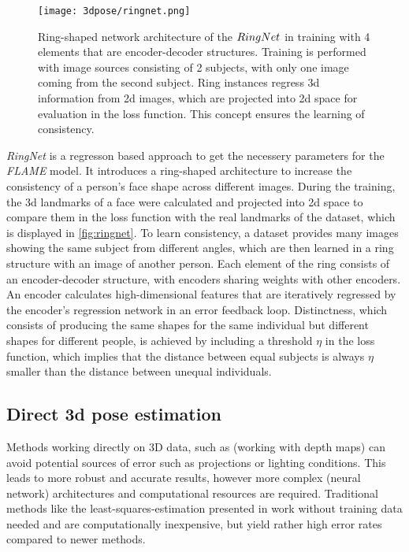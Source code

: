 \begin{figure}[h]
	\centering
	\texttt{[image: 3dpose/ringnet.png]}
	\caption{Ring-shaped network architecture of the $\protect RingNet$ in training with 4 elements that are encoder-decoder structures. Training is performed with image sources consisting of 2 subjects, with only one image coming from the second subject. Ring instances regress 3d information from 2d images, which are projected into 2d space for evaluation in the loss function. This concept ensures the learning of consistency.\cite{ringnet}}
	\label{fig:ringnet}
\end{figure}

\emph{RingNet} \cite{ringnet} is a regresson based approach to get the necessery parameters for the \emph{FLAME} model. It introduces a ring-shaped architecture to increase the consistency of a person's face shape across different images. During the training, the 3d landmarks of a face were calculated and projected into 2d space to compare them in the loss function with the real landmarks of the dataset, which is displayed in \autoref{fig:ringnet}. To learn consistency, a dataset provides many images showing the same subject from different angles, which are then learned in a ring structure with an image of another person. Each element of the ring consists of an encoder-decoder structure, with encoders sharing weights with other encoders. An encoder calculates high-dimensional features that are iteratively regressed by the encoder's regression network in an error feedback loop. Distinctness, which consists of producing the same shapes for the same individual but different shapes for different people, is achieved by including a threshold $\eta$ in the loss function, which implies that the distance between equal subjects is always $\eta$ smaller than the distance between unequal individuals. \\






\subsection{Direct 3d pose estimation}
Methods working directly on 3D data, such as \cite{Ye2011} (working with depth maps) can avoid potential sources of error such as projections or lighting conditions. This leads to more robust and accurate results, however more complex (neural network) architectures and computational resources are required. Traditional methods like the least-squares-estimation presented in \cite{Haralick98} work without training data needed and are computationally inexpensive, but yield rather high error rates compared to newer methods.\\